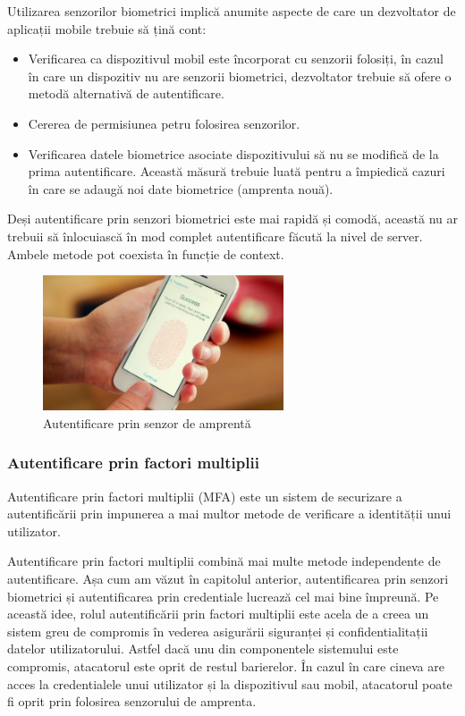 \documentclass[12pt]{article}
\begin{document}
Utilizarea senzorilor biometrici implică anumite aspecte de care un dezvoltator de
aplicații mobile trebuie să țină cont:

\begin{itemize}
    \item Verificarea ca dispozitivul mobil este încorporat cu senzorii folosiți,
    în cazul în care un dispozitiv nu are senzorii biometrici, dezvoltator trebuie 
    să ofere o metodă alternativă de autentificare. \cite{enisa-2017}
    \item Cererea de permisiunea petru folosirea senzorilor.
    \item Verificarea datele biometrice asociate dispozitivului să nu se modifică
    de la prima autentificare. Această măsură trebuie luată pentru a împiedică cazuri
    în care se adaugă noi date biometrice (amprenta nouă).
\end{itemize}

Deși autentificare prin senzori biometrici este mai rapidă și comodă, această nu ar trebuii
să înlocuiască în mod complet autentificare făcută la nivel de server. 
Ambele metode pot coexista în funcție de context.

\begin{figure}[H]
\centering
\includegraphics[height=4cm]{fingerprint-smartphone_0.jpg}
\caption{Autentificare prin senzor de amprentă}
\end{figure}


\newpage
\subsubsection{Autentificare prin factori multiplii}

Autentificare prin factori multiplii (MFA) este un sistem de securizare a autentificării
prin impunerea a mai multor metode de verificare a identității unui utilizator.

Autentificare prin factori multiplii combină mai multe metode independente de autentificare.
Așa cum am văzut în capitolul anterior, autentificarea prin senzori biometrici și autentificarea
prin credentiale lucrează cel mai bine împreună. Pe această idee, rolul autentificării prin factori
multiplii este acela de a creea un sistem greu de compromis în vederea asigurării siguranței și
confidentialitații datelor utilizatorului. Astfel dacă unu din componentele sistemului este compromis,
atacatorul este oprit de restul barierelor. În cazul în care cineva are acces la credentialele unui 
utilizator și la dispozitivul sau mobil, atacatorul poate fi oprit prin folosirea senzorului de amprenta.
\end{document}
